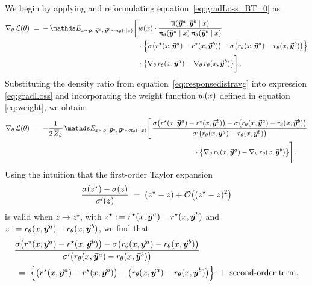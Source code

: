	We begin by applying  and reformulating equation~\eqref{eq:gradLoss_BT_0} as
	\begin{align}
		\gradtheta \Loss(\paratheta) \; = \; - \, \Exp_{\prompt \sim \promptdistr; \; \responseone, \, \responsetwo \sim \policytheta(\cdot \mid \prompt)}
		\bigg[ \, & \weight(\prompt) \cdot \frac{\responsedistravg ( \responseone, \responsetwo \mid \prompt )}{\policytheta(\responseone \mid \prompt) \, \policytheta(\responsetwo \mid \prompt)} \notag \\
		& \cdot \Big\{ \sigmoid \big( \rewardstar(\context, \responseone) - \rewardstar(\context, \responsetwo) \big) - \sigmoid \big( \rewardtheta(\context, \responseone) - \rewardtheta(\context, \responsetwo) \big) \Big\} \notag \\ 
		& \cdot \big\{ \gradtheta \rewardtheta(\prompt, \responseone) - \gradtheta \rewardtheta(\prompt, \responsetwo) \big\} \bigg] \,.
		\label{eq:gradLoss}
	\end{align}
	Substituting the density ratio from equation~\eqref{eq:responsedistravg} into expression \eqref{eq:gradLoss} and incorporating the weight function $w(x)$ defined in equation \eqref{eq:weight}, we obtain 
	\begin{align}
		\gradtheta \Loss(\paratheta) \; = \; - \frac{1}{2 \, \Partitionthetabar} \, \Exp_{\prompt \sim \promptdistr; \; \responseone, \, \responsetwo \sim \policytheta(\cdot \mid \prompt)}
		\Bigg[ \, & 
		\frac{\sigmoid \big( \rewardstar(\context, \responseone) - \rewardstar(\context, \responsetwo) \big) - \sigmoid \big( \rewardtheta(\context, \responseone) - \rewardtheta(\context, \responsetwo) \big)}{\divsigmoid \big( \rewardtheta(\prompt, \responseone) - \rewardtheta(\prompt, \responsetwo) \big)}  \notag  \\
		& \qquad \qquad \qquad \cdot \big\{ \gradtheta \rewardtheta(\prompt, \responseone) - \gradtheta \rewardtheta(\prompt, \responsetwo) \big\} \Bigg] \, .  \label{eq:gradLoss_0}
	\end{align}
	Using the intuition that the first-order Taylor expansion
	\begin{align*}
		\frac{\sigma(z^{\star}) - \sigma(z)}{\sigma'(z)} \; = \; (z^{\star} - z) + \mathcal{O}\big((z^{\star} - z)^2\big)
	\end{align*}
	is valid when $z \to z^\star$, with $z^\star :\,= r^{\star}(x, \vec{\boldsymbol{y}}\!\,^a) - r^{\star}(x, \vec{\boldsymbol{y}}\!\,^b)$ and $z :\,= r_{\theta}(x, \vec{\boldsymbol{y}}\!\,^a) - r_{\theta}(x, \vec{\boldsymbol{y}}\!\,^b)$, we find that
	\begin{align*}
		& \frac{\sigmoid \big( \rewardstar(\context, \responseone) - \rewardstar(\context, \responsetwo) \big) - \sigmoid \big( \rewardtheta(\context, \responseone) - \rewardtheta(\context, \responsetwo) \big)}{\divsigmoid \big( \rewardtheta(\prompt, \responseone) - \rewardtheta(\prompt, \responsetwo) \big)}  \\
		& \; = \; \Big\{ \big( \rewardstar(\context, \responseone) - \rewardstar(\context, \responsetwo) \big) - \big( \rewardtheta(\context, \responseone) - \rewardtheta(\context, \responsetwo) \big) \Big\} \; + \; \mbox{second-order term}.
	\end{align*}
